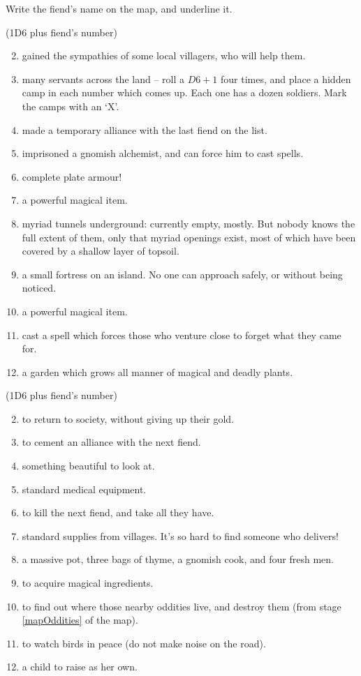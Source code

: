 \begin{multicols}{2}
Write the fiend's name on the map, and underline it.


(1D6 plus fiend's number)

\begin{enumerate}
\setcounter{enumi}{1}
\item
  gained the sympathies of some local villagers, who will help them.
\item
  many servants across the land -- roll a $D6 + 1$ four times, and place a hidden camp in each number which comes up.
  Each one has a dozen soldiers.
  Mark the camps with an `X'.
\item
  made a temporary alliance with the last fiend on the list.
\item
  imprisoned a gnomish alchemist, and can force him to cast spells.
\item
  complete plate armour!
\item
  a powerful magical item.
\item
  myriad tunnels underground: currently empty, mostly. But nobody knows
  the full extent of them, only that myriad openings exist, most of
  which have been covered by a shallow layer of topsoil.
\item
  a small fortress on an island. No one can approach safely, or without
  being noticed.
\item
  a powerful magical item.
\item
  cast a spell which forces those who venture close to forget what they
  came for.
\item
  a garden which grows all manner of magical and deadly plants.
\end{enumerate}


(1D6 plus fiend's number)

\begin{enumerate}
\setcounter{enumi}{1}
\item
  to return to society, without giving up their gold.
\item
  to cement an alliance with the next fiend.
\item
  something beautiful to look at.
\item
  standard medical equipment.
\item
  to kill the next fiend, and take all they have.
\item
  standard supplies from villages. It's so hard to find someone who
  delivers!
\item
  a massive pot, three bags of thyme, a gnomish cook, and four fresh men.
\item
  to acquire magical ingredients.
\item
  to find out where those nearby oddities live, and destroy them (from stage \ref{mapOddities} of the map).
\item
  to watch birds in peace (do not make noise on the road).
\item
  a child to raise as her own.
\end{enumerate}


\end{multicols}
